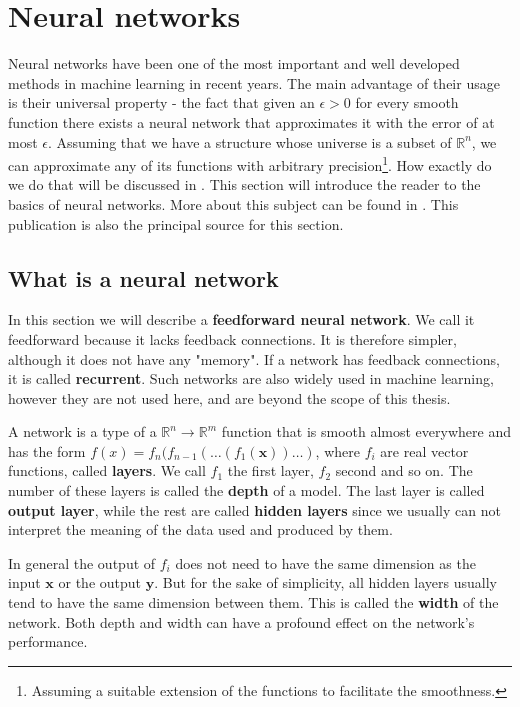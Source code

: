 \section{Neural networks}
Neural networks have been one of the most important and well developed methods in machine learning in recent years. The main advantage of their usage is their universal property - the fact that given an $\epsilon>0$ for every smooth function there exists  a neural network that approximates it with the error of at most $\epsilon$. Assuming that we have a structure whose universe is a subset of $\mathbb{R}^n$, we can approximate any of its functions with arbitrary precision\footnote{Assuming a suitable extension of the functions to facilitate the smoothness.}. How exactly do we do that will be discussed in . This section will introduce the reader to the basics of neural networks. More about this subject can be found in \cite{neural}. This publication is also the principal source for this section.

\subsection{What is a neural network}
\label{section:nn}
In this section we will describe a \textbf{feedforward neural network}. We call it feedforward because it lacks feedback connections. It is therefore simpler, although it does not have any "memory". If a network has feedback connections, it is called \textbf{recurrent}. Such networks are also widely used in machine learning, however they are not used here, and are beyond the scope of this thesis.

A network is a type of a $\mathbb{R}^n\rightarrow\mathbb{R}^m$ function that is smooth almost everywhere and has the form $f(x)=f_n(f_{n-1}(\dots (f_1(\textbf{x}))\dots)$, where $f_i$ are real vector functions, called \textbf{layers}. We call $f_1$ the first layer, $f_2$ second and so on. The number of these layers is called the \textbf{depth} of a model. The last layer is called \textbf{output layer}, while the rest are called \textbf{hidden layers} since we usually can not interpret the meaning of the data used and produced by them.

In general the output of $f_i$ does not need to have the same dimension as the input $\textbf{x}$ or the output $\textbf{y}$. But for the sake of simplicity, all hidden layers usually tend to have the same dimension between them. This is called the \textbf{width} of the network. Both depth and width can have a profound effect on the network's performance. 

